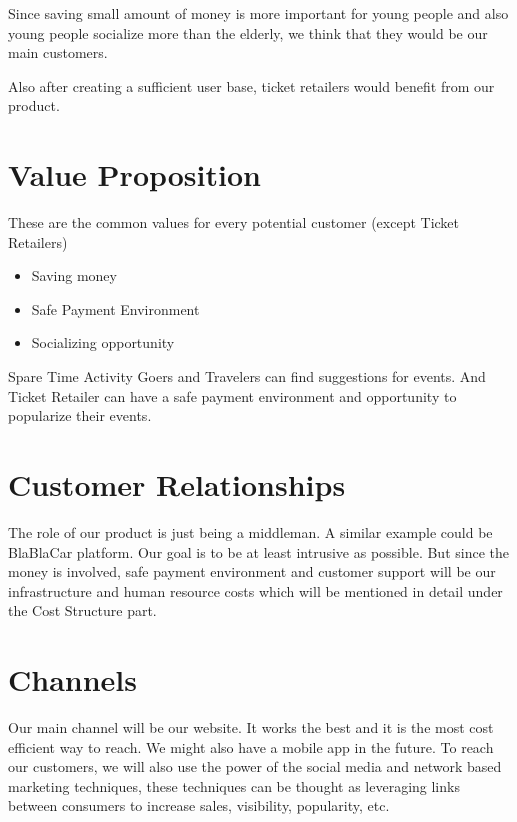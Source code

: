 \documentclass{article}
\begin{document}
Since saving small amount of money is more important for young people and also young people socialize more than the elderly, we think that they would be our main customers.

Also after creating a sufficient user base, ticket retailers would benefit from our product.

\vspace{-3mm}
\section{Value Proposition}
These are the common values for every potential customer (except Ticket Retailers)
\begin{itemize}
    \item Saving money
    \item Safe Payment Environment
    \item Socializing opportunity
\end{itemize}

Spare Time Activity Goers and Travelers can find suggestions for events. And Ticket Retailer can have a safe payment environment and opportunity to popularize their events.



\vspace{-3mm}
\section{Customer Relationships}

The role of our product is just being a middleman. A similar example could be BlaBlaCar platform. Our goal is to be at least intrusive as possible. But since the money is involved, safe payment environment and customer support will be our infrastructure and human resource costs which will be mentioned in detail under the Cost Structure part.


\vspace{-3mm}
\section{Channels}

Our main channel will be our website. It works the best and it is the most cost efficient way to reach. We might also have a mobile app in the future. To reach our customers, we will also use the power of the social media and network based marketing techniques, these techniques can be thought as leveraging links between consumers to increase sales, visibility, popularity, etc.
\end{document}
